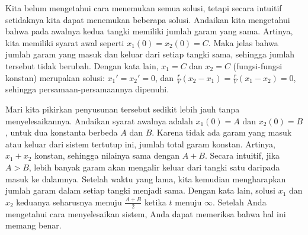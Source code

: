 \begin{example}
Kita belum mengetahui cara menemukan semua solusi, tetapi
secara intuitif setidaknya kita dapat menemukan beberapa solusi.  Andaikan kita
mengetahui bahwa pada awalnya kedua tangki memiliki jumlah garam yang sama.  Artinya,
kita memiliki syarat awal seperti $x_1(0)=x_2(0) = C$.  Maka jelas bahwa
jumlah garam yang masuk dan keluar dari setiap tangki sama, sehingga jumlah tersebut
tidak berubah.  Dengan kata lain, $x_1 = C$ dan $x_2 = C$ (fungsi-fungsi
konstan) merupakan solusi: $x_1' = x_2' = 0$, dan
$\frac{r}{V}(x_2-x_1) = \frac{r}{V}(x_1-x_2) = 0$, sehingga persamaan-persamaannya dipenuhi.

Mari kita pikirkan penyusunan tersebut sedikit lebih jauh tanpa menyelesaikannya.  Andaikan
syarat awalnya adalah $x_1(0) = A$ dan $x_2(0) = B$, untuk dua konstanta
berbeda $A$ dan $B$.  Karena tidak ada garam yang masuk atau keluar dari sistem tertutup ini,
jumlah total garam konstan.  Artinya, $x_1+x_2$ konstan,
sehingga nilainya sama dengan $A+B$.
Secara intuitif, jika $A > B$, lebih banyak garam akan mengalir keluar dari tangki
satu daripada masuk ke dalamnya.  Setelah waktu yang lama, kita kemudian mengharapkan
jumlah garam dalam setiap tangki menjadi sama. Dengan kata lain,
solusi $x_1$ dan $x_2$ keduanya seharusnya
menuju $\frac{A+B}{2}$ ketika
$t$ menuju $\infty$.
Setelah Anda mengetahui cara menyelesaikan sistem,
Anda dapat memeriksa
bahwa hal ini memang benar.
\end{example}

